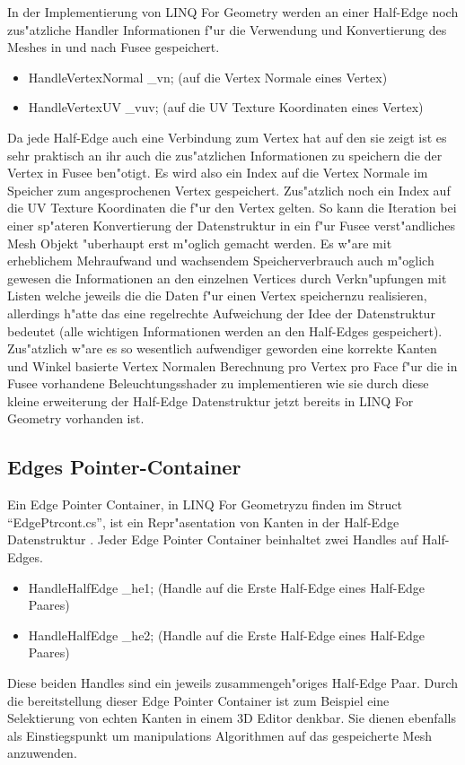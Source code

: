 \documentclass[pagesize, paper=a4, fontsize=12pt,titlepage=true, headings=small, headnosepline, abstractoff, liststotoc, nochapterprefix, plainheadsepline]{scrreprt}
\newcommand{\LFG}{LINQ For Geometry}
\newcommand{\LFGS}{LINQ For Geometry }
\newcommand{\HES}{Half-Edge Datenstruktur }
\begin{document}
In der Implementierung von \LFGS werden an einer Half-Edge noch zus"atzliche Handler Informationen f"ur die Verwendung und Konvertierung des Meshes in und nach Fusee gespeichert.

\begin{itemize}
\item HandleVertexNormal \_vn; (auf die Vertex Normale eines Vertex)
\item HandleVertexUV \_vuv; (auf die UV Texture Koordinaten eines Vertex)
\end{itemize}

Da jede Half-Edge auch eine Verbindung zum Vertex hat auf den sie zeigt ist es sehr praktisch an ihr auch die zus"atzlichen Informationen zu speichern die der Vertex in Fusee ben"otigt. Es wird also ein Index auf die Vertex Normale im Speicher zum angesprochenen Vertex gespeichert. Zus"atzlich noch ein Index auf die UV Texture Koordinaten die f"ur den Vertex gelten. So kann die Iteration bei einer sp"ateren Konvertierung der Datenstruktur in ein f"ur Fusee verst"andliches Mesh Objekt "uberhaupt erst m"oglich gemacht werden. Es w"are mit erheblichem Mehraufwand und wachsendem Speicherverbrauch auch m"oglich gewesen die Informationen an den einzelnen Vertices durch Verkn"upfungen mit Listen welche jeweils die die Daten f"ur einen Vertex speichernzu realisieren, allerdings h"atte das eine regelrechte Aufweichung der Idee der Datenstruktur bedeutet (alle wichtigen Informationen werden an den Half-Edges gespeichert). Zus"atzlich w"are es so wesentlich aufwendiger geworden eine korrekte Kanten und Winkel basierte Vertex Normalen Berechnung pro Vertex pro Face f"ur die in Fusee vorhandene Beleuchtungsshader zu implementieren wie sie durch diese kleine erweiterung der \HES jetzt bereits in \LFGS vorhanden ist.
		\subsection {Edges Pointer-Container}
			Ein Edge Pointer Container, in \LFG zu finden im Struct "`EdgePtrcont.cs"', ist ein Repr"asentation von Kanten in der \HES. Jeder Edge Pointer Container beinhaltet zwei Handles auf Half-Edges.
\begin{itemize}
\item HandleHalfEdge \_he1; (Handle auf die Erste Half-Edge eines Half-Edge Paares)
\item HandleHalfEdge \_he2; (Handle auf die Erste Half-Edge eines Half-Edge Paares)
\end{itemize}
Diese beiden Handles sind ein jeweils zusammengeh"origes Half-Edge Paar. Durch die bereitstellung dieser Edge Pointer Container ist zum Beispiel eine Selektierung von echten Kanten in einem 3D Editor denkbar. Sie dienen ebenfalls als Einstiegspunkt um manipulations Algorithmen auf das gespeicherte Mesh anzuwenden.
\end{document}

